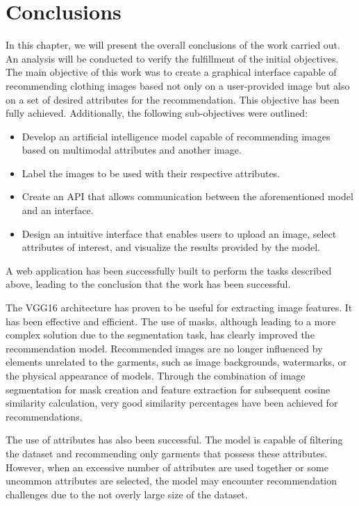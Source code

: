 \documentclass[12pt]{report} %
\begin{document}
\section*{Conclusions}
In this chapter, we will present the overall conclusions of the work carried out. An analysis will be conducted to verify the fulfillment of the initial objectives. The main objective of this work was to create a graphical interface capable of recommending clothing images based not only on a user-provided image but also on a set of desired attributes for the recommendation. This objective has been fully achieved. Additionally, the following sub-objectives were outlined:

\begin{itemize}
	\item Develop an artificial intelligence model capable of recommending images based on multimodal attributes and another image.
	\item Label the images to be used with their respective attributes.
	\item Create an API that allows communication between the aforementioned model and an interface.
	\item Design an intuitive interface that enables users to upload an image, select attributes of interest, and visualize the results provided by the model.
\end{itemize}

A web application has been successfully built to perform the tasks described above, leading to the conclusion that the work has been successful.

The VGG16 architecture has proven to be useful for extracting image features. It has been effective and efficient. The use of masks, although leading to a more complex solution due to the segmentation task, has clearly improved the recommendation model. Recommended images are no longer influenced by elements unrelated to the garments, such as image backgrounds, watermarks, or the physical appearance of models. Through the combination of image segmentation for mask creation and feature extraction for subsequent cosine similarity calculation, very good similarity percentages have been achieved for recommendations.

The use of attributes has also been successful. The model is capable of filtering the dataset and recommending only garments that possess these attributes. However, when an excessive number of attributes are used together or some uncommon attributes are selected, the model may encounter recommendation challenges due to the not overly large size of the dataset.
\end{document}
